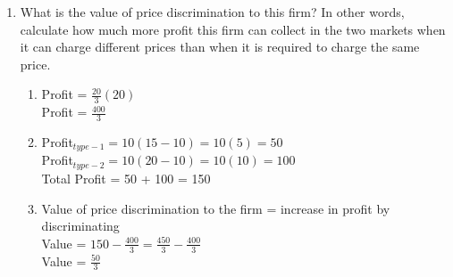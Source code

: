 \documentclass[11pt]{article}
\begin{document}
\begin{enumerate}
\begin{enumerate}
	
	\item What is the value of price discrimination to this firm? In other words, calculate how much more profit this firm can collect in the two markets when it can charge different prices than when it is required to charge the same price.
	\begin{enumerate}
        \item Profit = $\frac{20}{3}(20)$\\
        Profit = $\frac{400}{3}$
        \item Profit$_{type-1} = 10(15-10) = 10(5) = 50$\\
        Profit$_{type-2} = 10(20-10) = 10(10) = 100$\\
        Total Profit = 50 + 100 = 150
        \item Value of price discrimination to the firm = increase in profit by discriminating\\
        Value = $150 - \frac{400}{3} = \frac{450}{3} - \frac{400}{3}$\\
        Value = $\frac{50}{3}$
    \end{enumerate}
	
	
    \end{enumerate}
\end{enumerate}
\end{document}
